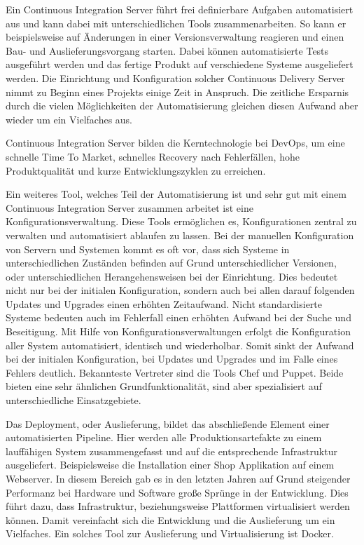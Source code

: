 Ein Continuous Integration Server führt frei definierbare Aufgaben automatisiert aus und kann dabei mit unterschiedlichen Tools zusammenarbeiten. 
So kann er beispielsweise auf Änderungen in einer Versionsverwaltung reagieren und einen Bau- und Auslieferungsvorgang starten. 
Dabei können automatisierte Tests ausgeführt werden und das fertige Produkt auf verschiedene Systeme ausgeliefert werden. 
Die Einrichtung und Konfiguration solcher Continuous Delivery Server nimmt zu Beginn eines Projekts einige Zeit in Anspruch. 
Die zeitliche Ersparnis durch die vielen Möglichkeiten der Automatisierung gleichen diesen Aufwand aber wieder um ein Vielfaches aus. 
\parencite[Vgl.][S. 79 - 134]{smart:2011}

Continuous Integration Server bilden die Kerntechnologie bei DevOps, um eine schnelle Time To Market, schnelles Recovery nach Fehlerfällen, hohe Produktqualität und kurze Entwicklungszyklen zu erreichen.

Ein weiteres Tool, welches Teil der Automatisierung ist und sehr gut mit einem Continuous Integration Server zusammen arbeitet ist eine Konfigurationsverwaltung. 
Diese Tools ermöglichen es, Konfigurationen zentral zu verwalten und automatisiert ablaufen zu lassen. 
Bei der manuellen Konfiguration von Servern und Systemen kommt es oft vor, dass sich Systeme in unterschiedlichen Zuständen befinden auf Grund unterschiedlicher Versionen, oder unterschiedlichen Herangehensweisen bei der Einrichtung. 
Dies bedeutet nicht nur bei der initialen Konfiguration, sondern auch bei allen darauf folgenden Updates und Upgrades einen erhöhten Zeitaufwand. 
Nicht standardisierte Systeme bedeuten auch im Fehlerfall einen erhöhten Aufwand bei der Suche und Beseitigung. 
Mit Hilfe von Konfigurationsverwaltungen erfolgt die Konfiguration aller System automatisiert, identisch und wiederholbar. 
Somit sinkt der Aufwand bei der initialen Konfiguration, bei Updates und Upgrades und im Falle eines Fehlers deutlich. 
Bekannteste Vertreter sind die Tools Chef und Puppet. 
Beide bieten eine sehr ähnlichen Grundfunktionalität, sind aber spezialisiert auf unterschiedliche Einsatzgebiete. 
\parencite[Vgl.][S. 1 - 32, S. 1 - 8]{krum:2014, taylor:2014}

Das Deployment, oder Auslieferung, bildet das abschließende Element einer automatisierten Pipeline. 
Hier werden alle Produktionsartefakte zu einem lauffähigen System zusammengefasst und auf die entsprechende Infrastruktur ausgeliefert.
Beispielsweise die Installation einer Shop Applikation auf einem Webserver. 
In diesem Bereich gab es in den letzten Jahren auf Grund steigender Performanz bei Hardware und Software große Sprünge in der Entwicklung. 
Dies führt dazu, dass Infrastruktur, beziehungsweise Plattformen virtualisiert werden können. 
Damit vereinfacht sich die Entwicklung und die Auslieferung um ein Vielfaches. Ein solches Tool zur Auslieferung und Virtualisierung ist Docker.

